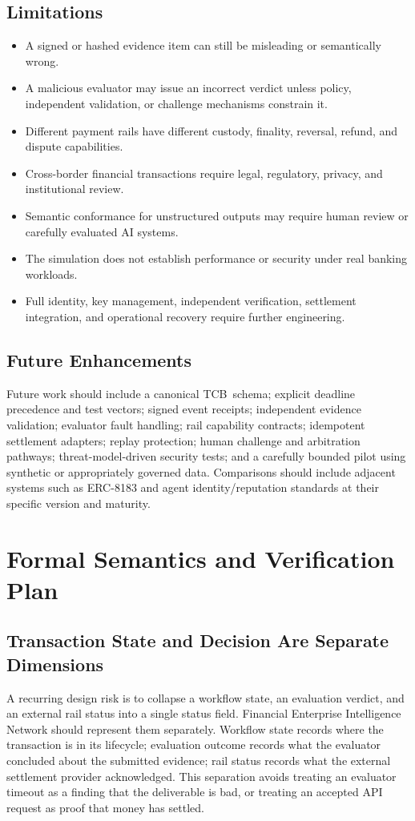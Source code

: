 \documentclass[12pt,a4paper,oneside]{report}
\newcommand{\TCB}{TCB}
\begin{document}
\section{Limitations}
\begin{itemize}[leftmargin=*]
\item A signed or hashed evidence item can still be misleading or semantically wrong.
\item A malicious evaluator may issue an incorrect verdict unless policy, independent validation, or challenge mechanisms constrain it.
\item Different payment rails have different custody, finality, reversal, refund, and dispute capabilities.
\item Cross-border financial transactions require legal, regulatory, privacy, and institutional review.
\item Semantic conformance for unstructured outputs may require human review or carefully evaluated AI systems.
\item The simulation does not establish performance or security under real banking workloads.
\item Full identity, key management, independent verification, settlement integration, and operational recovery require further engineering.
\end{itemize}

\section{Future Enhancements}
Future work should include a canonical \TCB\ schema; explicit deadline precedence and test vectors; signed event receipts; independent evidence validation; evaluator fault handling; rail capability contracts; idempotent settlement adapters; replay protection; human challenge and arbitration pathways; threat-model-driven security tests; and a carefully bounded pilot using synthetic or appropriately governed data. Comparisons should include adjacent systems such as ERC-8183 and agent identity/reputation standards at their specific version and maturity.

\chapter{Formal Semantics and Verification Plan}\label{chap:formal}
\section{Transaction State and Decision Are Separate Dimensions}
A recurring design risk is to collapse a workflow state, an evaluation verdict, and an external rail status into a single status field. Financial Enterprise Intelligence Network should represent them separately. Workflow state records where the transaction is in its lifecycle; evaluation outcome records what the evaluator concluded about the submitted evidence; rail status records what the external settlement provider acknowledged. This separation avoids treating an evaluator timeout as a finding that the deliverable is bad, or treating an accepted API request as proof that money has settled.
\end{document}
